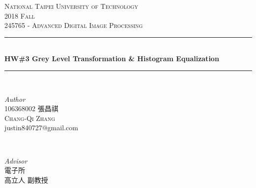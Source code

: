 \begin{titlepage} %
	\newcommand{\HRule}{\rule{\linewidth}{0.5mm}} %
						
	\center %
						
						
	\textsc{\LARGE National Taipei University of Technology}\\[1.5cm] %
						
	\textsc{\Large 2018 Fall}\\[0.5cm] %
						
	\textsc{\large 245765 - Advanced Digital Image Processing}\\[0.5cm] %
						
						
	\HRule\\[0.4cm]
						
	{\huge\bfseries HW\#3 Grey Level Transformation \& Histogram Equalization}\\[0.4cm] %
						
	\HRule\\[1.5cm]
						
	\begin{CJK}{UTF8}{bsmi}
		\begin{minipage}{0.4\textwidth}
			\begin{flushleft}
				\large
				\textit{Author}\\
				106368002 張昌祺\\ 
				\textsc{Chang-Qi Zhang} \\
				justin840727@gmail.com %
			\end{flushleft}
		\end{minipage}
		~
		\begin{minipage}{0.4\textwidth}
			\begin{flushright}
				\large
				\textit{Advisor}\\
				電子所 \\
				高立人 副教授 %
			\end{flushright}
		\end{minipage}
	\end{CJK}
						

\end{titlepage}
